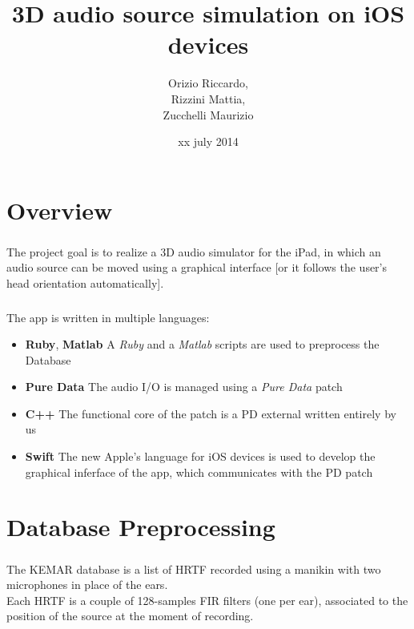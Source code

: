\documentclass{beamer}
\title{3D audio source simulation on iOS devices}
\author[Orizio, Rizzini, Zucchelli]{Orizio Riccardo,\\Rizzini Mattia,\\Zucchelli Maurizio}
\date{xx july 2014}
\institute[UniBS]{University of Brescia}
\begin{document}
	\begin{frame}
		\maketitle
	\end{frame}

	\section{Overview}
	
	\begin{frame}
		\frametitle{\insertsection}
		The project goal is to realize a 3D audio simulator for the iPad, in
		which an audio source can be moved using a graphical interface [or it follows
		the user's head orientation automatically].\\
	\end{frame}

	\begin{frame}
		\frametitle{\insertsection}
		The app is written in multiple languages:
		\begin{itemize}
			\item {\bf Ruby}, {\bf Matlab} A {\em Ruby} and a {\em Matlab} scripts are used to 
			preprocess the Database
			\item {\bf Pure Data} The audio I/O is managed using a {\em Pure Data} patch
			\item {\bf C++} The functional core of the patch is a PD external written entirely
				by us
			\item {\bf Swift} The new Apple's language for iOS devices is used to develop the
				graphical inferface of the app, which communicates with the PD patch
		\end{itemize}
	\end{frame}

	\AtBeginSection[]
	{
		\begin{frame}
			\frametitle{Outline}
			\tableofcontents[currentsection]
		\end{frame}
	}

	\section{Database Preprocessing}

	\begin{frame}
		\frametitle{\insertsection}
		The KEMAR database is a list of HRTF recorded using a manikin with two
		microphones in place of the ears.\\
		Each HRTF is a couple of 128-samples FIR filters (one per ear), associated to the position
		of the source at the moment of recording.\\
	\end{frame}
\end{document}
